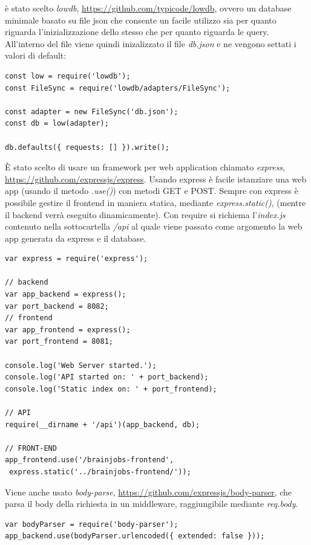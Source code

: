 \documentclass[a4paper,12pt, oneside]{book}
\begin{document}
è stato scelto \textit{lowdb}, \url{https://github.com/typicode/lowdb}, ovvero
un database minimale basato su file json che consente un facile utilizzo sia per quanto riguarda l'inizializzazione dello stesso che per quanto riguarda le query. All'interno del file viene quindi inizalizzato il file \textit{db.json} e ne vengono settati i valori di default:
\begin{shaded}
\begin{verbatim}
const low = require('lowdb');
const FileSync = require('lowdb/adapters/FileSync');

const adapter = new FileSync('db.json');
const db = low(adapter);

db.defaults({ requests: [] }).write();
\end{verbatim}
\end{shaded}
È stato scelto di usare un framework per web application chiamato \textit{express},
\url{https://github.com/expressjs/express}. Usando express è facile istanziare una
web app (usando il metodo \textit{.use()}) con metodi GET e POST. Sempre con express è possibile gestire il frontend
in maniera statica, mediante \textit{express.static()}, (mentre il backend verrà eseguito dinamicamente). Con require
si richiema l'\textit{index.js} contenuto nella sottocartella \textit{/api} al quale viene passato come argomento la web app generata da express e il database.
\begin{shaded}
\begin{verbatim}
var express = require('express');

// backend
var app_backend = express();
var port_backend = 8082;
// frontend
var app_frontend = express();
var port_frontend = 8081;

console.log('Web Server started.');
console.log('API started on: ' + port_backend);
console.log('Static index on: ' + port_frontend);

// API
require(__dirname + '/api')(app_backend, db);

// FRONT-END
app_frontend.use('/brainjobs-frontend',
 express.static('../brainjobs-frontend/'));
\end{verbatim}
\end{shaded}
Viene anche usato \textit{body-parse}, \url{https://github.com/expressjs/body-parser}, che parsa il body della richiesta in un middleware, raggiungibile mediante \textit{req.body}.
\begin{shaded}
\begin{verbatim}
var bodyParser = require('body-parser');
app_backend.use(bodyParser.urlencoded({ extended: false }));
\end{verbatim}
\end{shaded}
\end{document}
